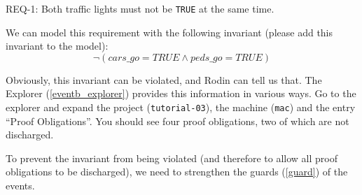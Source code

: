 \begin{center}REQ-1: Both traffic lights must not be \texttt{TRUE} at the same time.\end{center}

We can model this requirement with the following invariant (please add this invariant to the model):
\[
\lnot  (cars\_go = TRUE \land  peds\_go = TRUE)
\]

Obviously, this invariant can be violated, and Rodin can tell us that.  The Explorer (\ref{eventb_explorer}) provides this information in various ways.  Go to the explorer and expand the project (\texttt{tutorial-03}), the machine (\texttt{mac}) and the entry ``Proof Obligations''.  You should see four proof obligations, two of which are not discharged.


To prevent the invariant from being violated (and therefore to allow all proof obligations to be discharged), we need to strengthen the guards (\ref{guard}) of the events.


